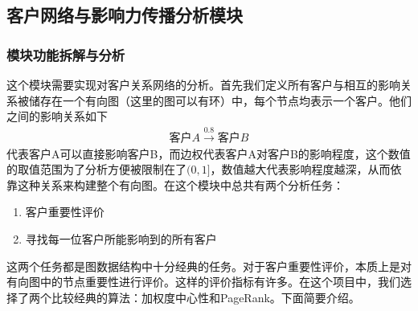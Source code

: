\documentclass[cn,hazy,blue,10pt,normal]{elegantnote}
\begin{document}


\subsection{客户网络与影响力传播分析模块}
\label{sec: customer}


\subsubsection{模块功能拆解与分析}
这个模块需要实现对客户关系网络的分析。首先我们定义所有客户与相互的影响关系被储存在一个有向图（这里的图可以有环）中，每个节点均表示一个客户。他们之间的影响关系如下
\begin{align*}
    \text{客户}A \overset{0.8}{\longrightarrow} \text{客户}B
\end{align*}
代表客户A可以直接影响客户B，而边权代表客户A对客户B的影响程度，这个数值的取值范围为了分析方便被限制在了$(0,1]$，数值越大代表影响程度越深，从而依靠这种关系来构建整个有向图。在这个模块中总共有两个分析任务：
\begin{enumerate}
    \item 客户重要性评价
    \item 寻找每一位客户所能影响到的所有客户
\end{enumerate}
这两个任务都是图数据结构中十分经典的任务。对于客户重要性评价，本质上是对有向图中的节点重要性进行评价。这样的评价指标有许多。在这个项目中，我们选择了两个比较经典的算法：加权度中心性和PageRank。下面简要介绍。
\end{document}
